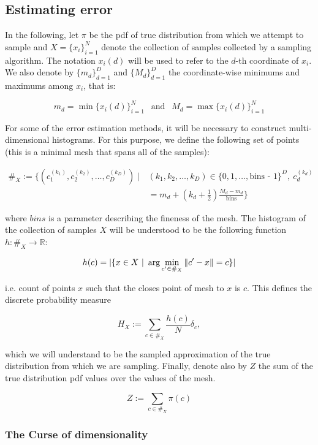\subsection{Estimating error}

In the following, let $\pi$ be the pdf of true distribution from which we attempt to sample and $X = \{x_i\}_{i=1}^N$ denote the collection of samples collected by a sampling algorithm. The notation $x_i(d)$ will be used to refer to the $d$-th coordinate of $x_i$. We also denote by $\{m_d\}_{d=1}^D$ and $\{M_d\}_{d=1}^D$ the coordinate-wise minimums and maximums among $x_i$, that is:

$$ 
    m_d = \min \{x_i(d)\}_{i=1}^N \ \ \text{ and } \ \ M_d = \max \{x_i(d)\}_{i=1}^N
$$

For some of the error estimation methods, it will be necessary to construct multi-dimensional histograms. For this purpose, we define the following set of points (this is a minimal mesh that spans all of the samples):

\begin{align*}
    \#_X := \Big\{ \left(c_1^{(k_1)}, c_2^{(k_2)}, \dots, c_D^{(k_D)}\right)\ |\ &(k_1, k_2, \dots, k_D) \in \lbrace 0, 1, \dots, \text{bins - 1}\rbrace^D, \ c_d^{(k_d)} \\
    &= m_d + \left(k_d + \frac 1 2\right) \frac{M_d - m_d}{\text{bins}} \Big\}
\end{align*}

where $bins$ is a parameter describing the fineness of the mesh. The histogram of the collection of samples $X$ will be understood to be the following function $h: \#_X \rightarrow \mathbb R$:

$$
    h(c) = |\{x \in X\ |\ \arg \min_{c' \in \#_X} \norm{c' - x} = c \}|
$$

i.e. count of points $x$ such that the closes point of mesh to $x$ is $c$. This defines the discrete probability measure 

$$H_X := \sum_{c \in \#_X} \frac {h(c)} N   \delta_c,$$

which we will understand to be the sampled approximation of the true distribution from which we are sampling. Finally, denote also by $Z$ the sum of the true distribution pdf values over the values of the mesh.

\[Z := \sum_{c \in \#_X} \pi(c)\]



\subsubsection{The Curse of dimensionality}


